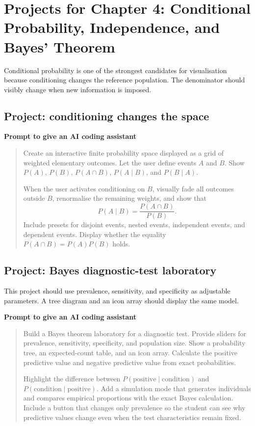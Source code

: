 \section{Projects for Chapter 4: Conditional Probability, Independence, and Bayes' Theorem}

Conditional probability is one of the strongest candidates for visualisation because conditioning changes the reference population. The denominator should visibly change when new information is imposed.

\subsection*{Project: conditioning changes the space}

\begin{examplebox}
\textbf{Prompt to give an AI coding assistant}

\begin{quote}\small
Create an interactive finite probability space displayed as a grid of weighted elementary outcomes. Let the user define events \(A\) and \(B\). Show \(P(A)\), \(P(B)\), \(P(A\cap B)\), \(P(A\mid B)\), and \(P(B\mid A)\).

When the user activates conditioning on \(B\), visually fade all outcomes outside \(B\), renormalise the remaining weights, and show that
\[
P(A\mid B)=\frac{P(A\cap B)}{P(B)}.
\]
Include presets for disjoint events, nested events, independent events, and dependent events. Display whether the equality \(P(A\cap B)=P(A)P(B)\) holds.
\end{quote}
\end{examplebox}

\subsection*{Project: Bayes diagnostic-test laboratory}

This project should use prevalence, sensitivity, and specificity as adjustable parameters. A tree diagram and an icon array should display the same model.

\begin{examplebox}
\textbf{Prompt to give an AI coding assistant}

\begin{quote}\small
Build a Bayes theorem laboratory for a diagnostic test. Provide sliders for prevalence, sensitivity, specificity, and population size. Show a probability tree, an expected-count table, and an icon array. Calculate the positive predictive value and negative predictive value from exact probabilities.

Highlight the difference between \(P(\text{positive}\mid\text{condition})\) and \(P(\text{condition}\mid\text{positive})\). Add a simulation mode that generates individuals and compares empirical proportions with the exact Bayes calculation. Include a button that changes only prevalence so the student can see why predictive values change even when the test characteristics remain fixed.
\end{quote}
\end{examplebox}

